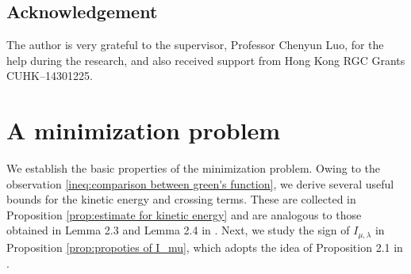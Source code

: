 \documentclass[11pt,letterpaper]{amsart}
\theoremstyle{definition}
\theoremstyle{remark}
\numberwithin{equation}{section}
\begin{document}


\subsection*{Acknowledgement}
The author is very grateful to the supervisor, Professor Chenyun Luo, for the help during the research, and also received support from Hong Kong RGC Grants CUHK--14301225. 

\section{A minimization problem}\label{sec:minimization problem}

We establish the basic properties of the minimization problem. Owing to the observation \eqref{ineq:comparison between green's function}, we derive several useful bounds for the kinetic energy and crossing terms. These are collected in Proposition \ref{prop:estimate for kinetic energy} and are analogous to those obtained in Lemma 2.3 and Lemma 2.4 in \cite{abe2025existence}. Next, we study the sign of $I_{\mu,\lambda}$ in Proposition \ref{prop:propoties of I_mu}, which adopts the idea of Proposition 2.1 in \cite{Dong2026StabilityOV}.
\end{document}
